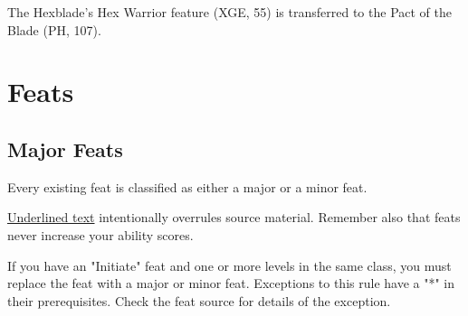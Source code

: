 \documentclass[letterpaper,twocolumn,openany,nodeprecatedcode,bg=print]{dndbook}
\begin{document}
The Hexblade's Hex Warrior feature (XGE, 55) is transferred to the Pact of the Blade (PH, 107).


\onecolumn

\chapter{Feats}

\section{Major Feats}
\label{major-feats-table}

Every existing feat is classified as either a major or a minor feat. 

\underline{Underlined text} intentionally overrules source material. 
Remember also that feats never increase your ability scores. 

If you have an "Initiate" feat and one or more levels in the same class, you must replace the feat with a major or minor feat. Exceptions to this rule have a "*" in their prerequisites. Check the feat source for details of the exception.
\end{document}
